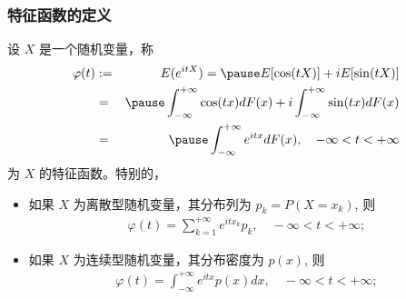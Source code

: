 \documentclass[Prob-All.tex]{subfiles}
\begin{document}
\begin{frame}
	\frametitle{特征函数的定义}
	\begin{defi}
		设 $X$ 是一个随机变量，称
		\begin{eqnarray*}
			\varphi(t)&:=&E(e^{itX})=\pause E[\cos(tX)]+iE[\sin(tX)]\\
			&=&\pause \int_{-\infty}^{+\infty}\cos(tx)dF(x)+i\int_{-\infty}^{+\infty}\sin(tx)dF(x)\\
			&=&\pause \int_{-\infty}^{+\infty}e^{itx}dF(x), \quad -\infty <t<+\infty
		\end{eqnarray*}
		\pause 为 $X$ 的特征函数。特别的，
		\begin{itemize}[<+-|alert@+>]
			\item
			如果 $X$ 为离散型随机变量，其分布列为 $p_k=P (X=x_k)$, 则
			\begin{eqnarray*}
				\varphi(t)=\sum_{k=1}^{+\infty}e^{itx_k}p_k, \quad -\infty <t<+\infty;
			\end{eqnarray*}
			\item  如果 $X$ 为连续型随机变量，其分布密度为 $p (x)$, 则
			\begin{eqnarray*}
				\varphi(t)=\int_{-\infty}^{+\infty}e^{itx}p(x)dx, \quad -\infty <t<+\infty;
			\end{eqnarray*}
		\end{itemize}

	\end{defi}
\end{frame}
\end{document}

